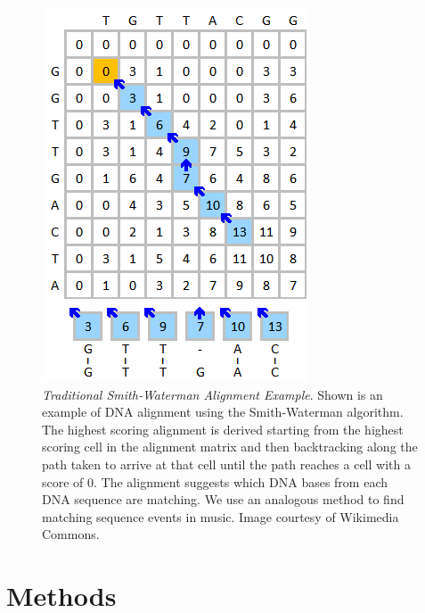 \documentclass[phd,electronic,oneside,twosidetoc,letterpaper,chaptercenter,parttop,lol,lof,lot]{byumsphd}
\begin{document}
\begin{figure}
	\centering
	\includegraphics[width=.6\linewidth]{swexample}
    \caption{\label{fig:swexample}\textit{Traditional Smith-Waterman Alignment Example}. Shown is an example of DNA alignment using the Smith-Waterman algorithm. The highest scoring alignment is derived starting from the highest scoring cell in the alignment matrix and then backtracking along the path taken to arrive at that cell until the path reaches a cell with a score of 0. The alignment suggests which DNA bases from each DNA sequence are matching. We use an analogous method to find matching sequence events in music. Image courtesy of Wikimedia Commons.}
\end{figure}


\section{Methods}
\end{document}
